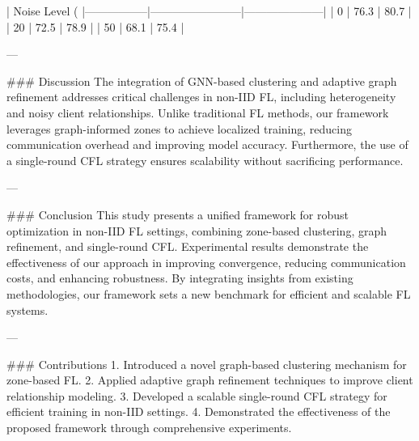 | Noise Level (%
|-----------------|------------------------|---------------------|
| 0               | 76.3                  | 80.7               |
| 20              | 72.5                  | 78.9               |
| 50              | 68.1                  | 75.4               |

---

### Discussion
The integration of GNN-based clustering and adaptive graph refinement addresses critical challenges in non-IID FL, including heterogeneity and noisy client relationships. Unlike traditional FL methods, our framework leverages graph-informed zones to achieve localized training, reducing communication overhead and improving model accuracy. Furthermore, the use of a single-round CFL strategy ensures scalability without sacrificing performance.

---

### Conclusion
This study presents a unified framework for robust optimization in non-IID FL settings, combining zone-based clustering, graph refinement, and single-round CFL. Experimental results demonstrate the effectiveness of our approach in improving convergence, reducing communication costs, and enhancing robustness. By integrating insights from existing methodologies, our framework sets a new benchmark for efficient and scalable FL systems.

---

### Contributions
1. Introduced a novel graph-based clustering mechanism for zone-based FL.
2. Applied adaptive graph refinement techniques to improve client relationship modeling.
3. Developed a scalable single-round CFL strategy for efficient training in non-IID settings.
4. Demonstrated the effectiveness of the proposed framework through comprehensive experiments.

